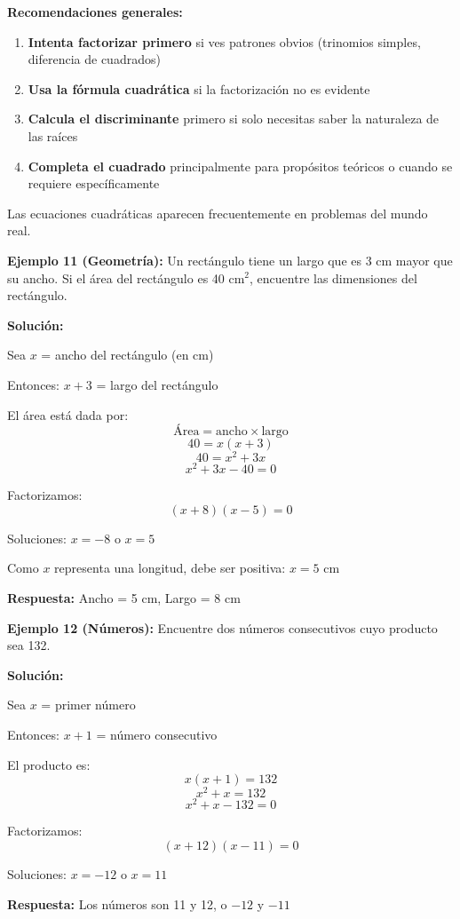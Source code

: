 \textbf{Recomendaciones generales:}

\begin{enumerate}
\item \textbf{Intenta factorizar primero} si ves patrones obvios (trinomios simples, diferencia de cuadrados)
\item \textbf{Usa la fórmula cuadrática} si la factorización no es evidente
\item \textbf{Calcula el discriminante} primero si solo necesitas saber la naturaleza de las raíces
\item \textbf{Completa el cuadrado} principalmente para propósitos teóricos o cuando se requiere específicamente
\end{enumerate}


Las ecuaciones cuadráticas aparecen frecuentemente en problemas del mundo real.

\begin{example}
\textbf{Ejemplo 11 (Geometría):} Un rectángulo tiene un largo que es 3 cm mayor que su ancho. Si el área del rectángulo es 40 cm$^2$, encuentre las dimensiones del rectángulo.

\textbf{Solución:}

Sea $x$ = ancho del rectángulo (en cm)

Entonces: $x + 3$ = largo del rectángulo

El área está dada por:
$$\text{Área} = \text{ancho} \times \text{largo}$$
$$40 = x(x + 3)$$
$$40 = x^2 + 3x$$
$$x^2 + 3x - 40 = 0$$

Factorizamos:
$$(x + 8)(x - 5) = 0$$

Soluciones: $x = -8$ o $x = 5$

Como $x$ representa una longitud, debe ser positiva: $x = 5$ cm

\textbf{Respuesta:} Ancho = 5 cm, Largo = 8 cm
\end{example}

\begin{example}
\textbf{Ejemplo 12 (Números):} Encuentre dos números consecutivos cuyo producto sea 132.

\textbf{Solución:}

Sea $x$ = primer número

Entonces: $x + 1$ = número consecutivo

El producto es:
$$x(x + 1) = 132$$
$$x^2 + x = 132$$
$$x^2 + x - 132 = 0$$

Factorizamos:
$$(x + 12)(x - 11) = 0$$

Soluciones: $x = -12$ o $x = 11$

\textbf{Respuesta:} Los números son 11 y 12, o $-12$ y $-11$
\end{example}

